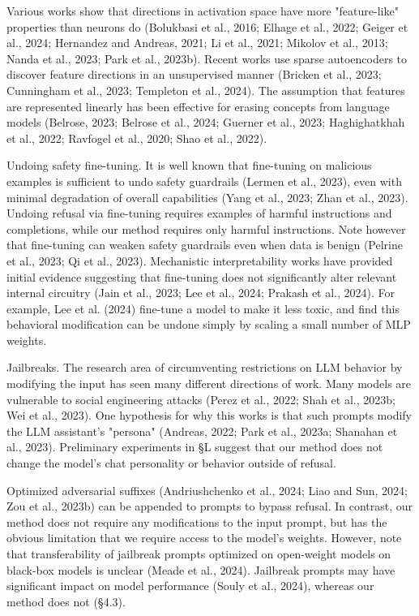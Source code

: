 \documentclass[10pt]{article}
\begin{document}
Various works show that directions in activation space have more "feature-like" properties than neurons do (Bolukbasi et al., 2016; Elhage et al., 2022; Geiger et al., 2024; Hernandez and Andreas, 2021; Li et al., 2021; Mikolov et al., 2013; Nanda et al., 2023; Park et al., 2023b). Recent works use sparse autoencoders to discover feature directions in an unsupervised manner (Bricken et al., 2023; Cunningham et al., 2023; Templeton et al., 2024). The assumption that features are represented linearly has been effective for erasing concepts from language models (Belrose, 2023; Belrose et al., 2024; Guerner et al., 2023; Haghighatkhah et al., 2022; Ravfogel et al., 2020; Shao et al., 2022).

Undoing safety fine-tuning. It is well known that fine-tuning on malicious examples is sufficient to undo safety guardrails (Lermen et al., 2023), even with minimal degradation of overall capabilities (Yang et al., 2023; Zhan et al., 2023). Undoing refusal via fine-tuning requires examples of harmful instructions and completions, while our method requires only harmful instructions. Note however that fine-tuning can weaken safety guardrails even when data is benign (Pelrine et al., 2023; Qi et al., 2023). Mechanistic interpretability works have provided initial evidence suggesting that fine-tuning does not significantly alter relevant internal circuitry (Jain et al., 2023; Lee et al., 2024; Prakash et al., 2024). For example, Lee et al. (2024) fine-tune a model to make it less toxic, and find this behavioral modification can be undone simply by scaling a small number of MLP weights.

Jailbreaks. The research area of circumventing restrictions on LLM behavior by modifying the input has seen many different directions of work. Many models are vulnerable to social engineering attacks (Perez et al., 2022; Shah et al., 2023b; Wei et al., 2023). One hypothesis for why this works is that such prompts modify the LLM assistant's "persona" (Andreas, 2022; Park et al., 2023a; Shanahan et al., 2023). Preliminary experiments in §L suggest that our method does not change the model's chat personality or behavior outside of refusal.

Optimized adversarial suffixes (Andriushchenko et al., 2024; Liao and Sun, 2024; Zou et al., 2023b) can be appended to prompts to bypass refusal. In contrast, our method does not require any modifications to the input prompt, but has the obvious limitation that we require access to the model's weights. However, note that transferability of jailbreak prompts optimized on open-weight models on black-box models is unclear (Meade et al., 2024). Jailbreak prompts may have significant impact on model performance (Souly et al., 2024), whereas our method does not (§4.3).
\end{document}
